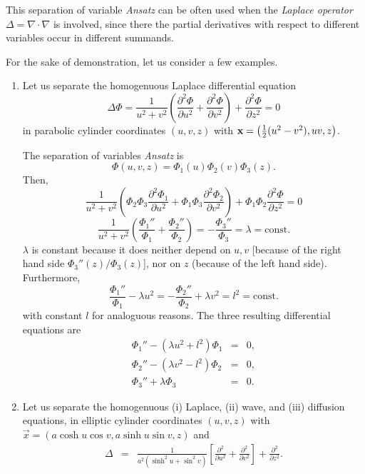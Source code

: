 This separation of variable {\it Ansatz}
can be often used when the
{\em Laplace operator}
$\Delta=\nabla  \cdot \nabla$
is involved, since there the partial derivatives with respect to different variables
occur in different summands.

{
\color{blue}
\bexample

For the sake of demonstration, let us consider a few examples.

\begin{enumerate}
\item
Let us separate the homogenuous Laplace differential equation \begin{equation}
\Delta \Phi =\frac{1}{u^2+v^2}
  \left(
    \frac{\partial^2\Phi}{\partial u^2}+
    \frac{\partial^2\Phi}{\partial v^2}
  \right)+
  \frac{\partial^2\Phi}{\partial z^2}
= 0
\end{equation}
in parabolic
cylinder coordinates $(u,v,z)$ with
${\bf x} = \left({1 \over 2} (u^2 - v^2), uv, z\right) $.


The separation of variables {\it Ansatz} is
$$\Phi(u,v,z)=\Phi_1(u)\Phi_2(v)\Phi_3(z).$$
Then,
$$
  \frac{1}{u^2+v^2}
  \left(
    \Phi_2\Phi_3\frac{\partial^2\Phi_1}{\partial u^2}+
    \Phi_1\Phi_3\frac{\partial^2\Phi_2}{\partial v^2}
  \right)+
  \Phi_1\Phi_2\frac{\partial^2\Phi}{\partial z^2}=0
$$
$$
 \frac{1}{u^2+v^2}
  \left(
    \frac{\Phi_1''}{\Phi_1}+
    \frac{\Phi_2''}{\Phi_2}
  \right)=
  -\frac{\Phi_3''}{\Phi_3}=\lambda=\mbox{const.}
$$
$\lambda$ is constant because it does neither depend on $u,v$ [because of the right hand side
$ {\Phi_3'' (z)/\Phi_3 (z)}$],
nor on $z$ (because of the left hand side).
Furthermore,
$$
  \frac{\Phi_1''}{\Phi_1}- \lambda u^2 =
-  \frac{\Phi_2''}{\Phi_2}+   \lambda v^2=l^2=\mbox{const.}
$$
with constant $l$ for analoguous reasons.
The three resulting differential equations are
\begin{eqnarray*}
  \Phi_1''-(\lambda u^2+l^2) \Phi_1 & = & 0, \\
  \Phi_2''-(\lambda v^2-l^2) \Phi_2 & = & 0, \\
  \Phi_3''+\lambda\Phi_3 & = & 0.
\end{eqnarray*}




\item
Let us separate the homogenuous
(i)  Laplace,
(ii) wave,
 and
(iii) diffusion    equations,
in
elliptic cylinder coordinates $(u,v,z)$ with
$\vec x = \left( a \cosh u \cos v, a \sinh u \sin v, z\right)$ and
\begin{eqnarray*}
  \Delta & = &  \frac{1}{a^2(\sinh^2u+\sin^2v)}
    \left[
      \frac{\partial^2}{\partial u^2}+
      \frac{\partial^2}{\partial v^2}
    \right]+\frac{\partial^2}{\partial z^2}.
\end{eqnarray*}


\end{enumerate}}
